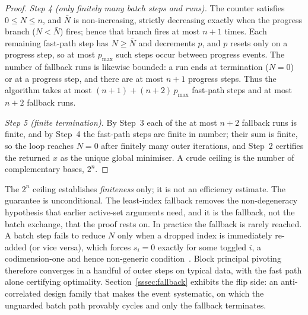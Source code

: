 \begin{proof}
\emph{Step 4 (only finitely many batch steps and runs).}
The counter satisfies $0 \le N \le n$, and $\bar N$ is non-increasing, strictly decreasing
exactly when the progress branch ($N < \bar N$) fires; hence that branch fires at most $n+1$
times. Each remaining fast-path step has $N \ge \bar N$ and decrements $p$, and $p$ resets only
on a progress step, so at most $p_{\max}$ such steps occur between progress events. The number
of fallback runs is likewise bounded: a run ends at termination ($N=0$) or at a progress step,
and there are at most $n+1$ progress steps. Thus the algorithm takes at most
$(n+1) + (n+2)\,p_{\max}$ fast-path steps and at most $n+2$ fallback runs.

\emph{Step 5 (finite termination).}
By Step~3 each of the at most $n+2$ fallback runs is finite, and by Step~4 the fast-path steps
are finite in number; their sum is finite, so the loop reaches $N=0$ after finitely many outer
iterations, and Step~2 certifies the returned $x$ as the unique global minimiser. A crude
ceiling is the number of complementary bases, $2^n$.
\end{proof}

The $2^n$ ceiling establishes \emph{finiteness} only; it is not an efficiency estimate. The
guarantee is unconditional. The least-index fallback removes the non-degeneracy hypothesis
that earlier active-set arguments need, and it is the fallback, not the batch exchange, that
the proof rests on. In practice the fallback is rarely reached. A batch step fails to
reduce $N$ only when a dropped index is immediately re-added (or vice versa), which forces
$s_i = 0$ exactly for some toggled $i$, a codimension-one and hence non-generic
condition~\cite{judice1994}. Block principal pivoting therefore converges in a handful of
outer steps on typical data, with the fast path alone certifying optimality.
Section~\ref{sssec:fallback} exhibits the flip side: an anti-correlated design family that
makes the event systematic, on which the unguarded batch path provably cycles and only the
fallback terminates.

